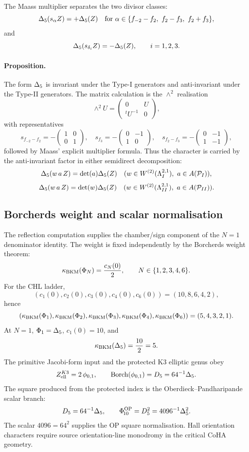 The Maass multiplier separates the two divisor classes:
\[
  \Delta_{5}(s_\alpha Z)=+\Delta_{5}(Z)
  \quad
  \text{for }
  \alpha\in\{f_{-2}-f_2,\ f_2-f_3,\ f_2+f_3\},
\]
and
\[
  \Delta_{5}(s_{\delta_i}Z)=-\Delta_{5}(Z),
  \qquad i=1,2,3.
\]
\paragraph{Proposition.}
The form $\Delta_{5}$ is invariant under the Type-I generators and
anti-invariant under the Type-II generators. The matrix calculation is
the $\wedge^2$ realisation
\[
  \wedge^2 U=
  \begin{pmatrix}
  0&U\\
  {}^tU^{-1}&0
  \end{pmatrix},
\]
with representatives
\[
  s_{f_{-2}-f_2}
  =-\begin{pmatrix}1&0\\0&1\end{pmatrix},
  \quad
  s_{f_3}
  =-\begin{pmatrix}0&-1\\1&0\end{pmatrix},
  \quad
  s_{f_2-f_3}
  =-\begin{pmatrix}0&-1\\1&-1\end{pmatrix},
\]
followed by Maass' explicit multiplier formula. Thus the character is
carried by the anti-invariant factor in either semidirect decomposition:
\[
  \Delta_{5}(w\,a\,Z)=\det(a)\Delta_{5}(Z)
  \quad
  (w\in W^{(2)}(\Lambda_I^{2,1}),\ a\in A(\mathcal{P}_I)),
\]
\[
  \Delta_{5}(w\,a\,Z)=\det(w)\Delta_{5}(Z)
  \quad
  (w\in W^{(2)}(\Lambda_{II}^{2,1}),\ a\in A(\mathcal{P}_{II})).
\]

\subsection*{Borcherds weight and scalar normalisation}

The reflection computation supplies the chamber/sign component of the
$N=1$ denominator identity. The weight is fixed independently by the
Borcherds weight theorem:
\[
  \kappa_{\mathrm{BKM}}(\Phi_N)=\frac{c_N(0)}{2},
  \qquad N\in\{1,2,3,4,6\}.
\]
For the CHL ladder,
\[
  (c_1(0),c_2(0),c_3(0),c_4(0),c_6(0))
  =(10,8,6,4,2),
\]
hence
\[
  (\kappa_{\mathrm{BKM}}(\Phi_1),\kappa_{\mathrm{BKM}}(\Phi_2),\kappa_{\mathrm{BKM}}(\Phi_3),
  \kappa_{\mathrm{BKM}}(\Phi_4),\kappa_{\mathrm{BKM}}(\Phi_6))
  =(5,4,3,2,1).
\]
At $N=1$, $\Phi_1=\Delta_{5}$, $c_1(0)=10$, and
\[
  \kappa_{\mathrm{BKM}}(\Delta_{5})=\frac{10}{2}=5.
\]
The primitive Jacobi-form input and the protected K3 elliptic genus obey
\[
  Z^{K3}_{\mathrm{ell}}=2\,\phi_{0,1},
  \qquad
  \operatorname{Borch}(\phi_{0,1})=D_5=64^{-1}\Delta_{5} .
\]
The square produced from the protected index is the
Oberdieck--Pandharipande scalar branch:
\[
  D_5=64^{-1}\Delta_{5},
  \qquad
  \Phi_{\!10}^{\mathrm{OP}}
  =D_5^2
  =4096^{-1}\Delta_{5}^2.
\]
The scalar $4096=64^2$ supplies the OP square normalisation. Hall
orientation characters require source orientation-line monodromy in the
critical CoHA geometry.

